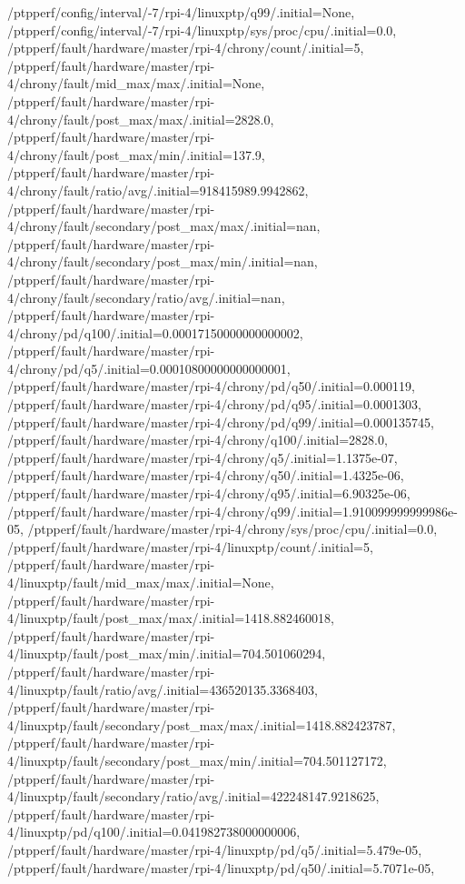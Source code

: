{    /ptpperf/config/interval/-7/rpi-4/linuxptp/q99/.initial=None,
    /ptpperf/config/interval/-7/rpi-4/linuxptp/sys/proc/cpu/.initial=0.0,
    /ptpperf/fault/hardware/master/rpi-4/chrony/count/.initial=5,
    /ptpperf/fault/hardware/master/rpi-4/chrony/fault/mid_max/max/.initial=None,
    /ptpperf/fault/hardware/master/rpi-4/chrony/fault/post_max/max/.initial=2828.0,
    /ptpperf/fault/hardware/master/rpi-4/chrony/fault/post_max/min/.initial=137.9,
    /ptpperf/fault/hardware/master/rpi-4/chrony/fault/ratio/avg/.initial=918415989.9942862,
    /ptpperf/fault/hardware/master/rpi-4/chrony/fault/secondary/post_max/max/.initial=nan,
    /ptpperf/fault/hardware/master/rpi-4/chrony/fault/secondary/post_max/min/.initial=nan,
    /ptpperf/fault/hardware/master/rpi-4/chrony/fault/secondary/ratio/avg/.initial=nan,
    /ptpperf/fault/hardware/master/rpi-4/chrony/pd/q100/.initial=0.00017150000000000002,
    /ptpperf/fault/hardware/master/rpi-4/chrony/pd/q5/.initial=0.00010800000000000001,
    /ptpperf/fault/hardware/master/rpi-4/chrony/pd/q50/.initial=0.000119,
    /ptpperf/fault/hardware/master/rpi-4/chrony/pd/q95/.initial=0.0001303,
    /ptpperf/fault/hardware/master/rpi-4/chrony/pd/q99/.initial=0.000135745,
    /ptpperf/fault/hardware/master/rpi-4/chrony/q100/.initial=2828.0,
    /ptpperf/fault/hardware/master/rpi-4/chrony/q5/.initial=1.1375e-07,
    /ptpperf/fault/hardware/master/rpi-4/chrony/q50/.initial=1.4325e-06,
    /ptpperf/fault/hardware/master/rpi-4/chrony/q95/.initial=6.90325e-06,
    /ptpperf/fault/hardware/master/rpi-4/chrony/q99/.initial=1.910099999999986e-05,
    /ptpperf/fault/hardware/master/rpi-4/chrony/sys/proc/cpu/.initial=0.0,
    /ptpperf/fault/hardware/master/rpi-4/linuxptp/count/.initial=5,
    /ptpperf/fault/hardware/master/rpi-4/linuxptp/fault/mid_max/max/.initial=None,
    /ptpperf/fault/hardware/master/rpi-4/linuxptp/fault/post_max/max/.initial=1418.882460018,
    /ptpperf/fault/hardware/master/rpi-4/linuxptp/fault/post_max/min/.initial=704.501060294,
    /ptpperf/fault/hardware/master/rpi-4/linuxptp/fault/ratio/avg/.initial=436520135.3368403,
    /ptpperf/fault/hardware/master/rpi-4/linuxptp/fault/secondary/post_max/max/.initial=1418.882423787,
    /ptpperf/fault/hardware/master/rpi-4/linuxptp/fault/secondary/post_max/min/.initial=704.501127172,
    /ptpperf/fault/hardware/master/rpi-4/linuxptp/fault/secondary/ratio/avg/.initial=422248147.9218625,
    /ptpperf/fault/hardware/master/rpi-4/linuxptp/pd/q100/.initial=0.041982738000000006,
    /ptpperf/fault/hardware/master/rpi-4/linuxptp/pd/q5/.initial=5.479e-05,
    /ptpperf/fault/hardware/master/rpi-4/linuxptp/pd/q50/.initial=5.7071e-05,
}
